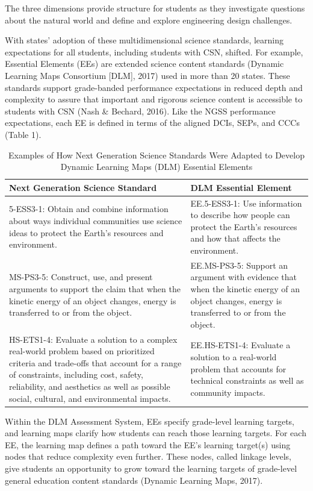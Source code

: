 \documentclass[11.5pt]{sig-alternate} %
\begin{document}
\begin{large}
The three dimensions provide structure for students as they investigate questions about the natural world and define and explore engineering design challenges.

With states’ adoption of these multidimensional science standards, learning expectations for all students, including students with CSN, shifted. For example, Essential Elements (EEs) are extended science content standards (Dynamic Learning Maps Consortium [DLM], 2017) used in more than 20 states. These standards support grade-banded performance expectations in reduced depth and complexity to assure that important and rigorous science content is accessible to students with CSN (Nash \& Bechard, 2016). Like the NGSS performance expectations, each EE is defined in terms of the aligned DCIs, SEPs, and CCCs (Table 1). 

\begin{table}[thbp]
\caption{Examples of How Next Generation Science Standards Were Adapted to Develop Dynamic Learning Maps (DLM) Essential Elements}
\begin{tabular}{|l|l|}
\hline
Next Generation Science Standard & DLM Essential Element \\ \hline
5-ESS3-1: Obtain and combine information about ways individual communities use science ideas to protect the Earth’s resources and environment. & EE.5-ESS3-1: Use information to describe how people can protect the Earth’s resources and how that affects the environment. \\ \hline
MS-PS3-5: Construct, use, and present arguments to support the claim that when the kinetic energy of an object changes, energy is transferred to or from the object. & EE.MS-PS3-5: Support an argument with evidence that when the kinetic energy of an object changes, energy is transferred to or from the object. \\ \hline
HS-ETS1-4: Evaluate a solution to a complex real-world problem based on prioritized criteria and trade-offs that account for a range of constraints, including cost, safety, reliability, and aesthetics as well as possible social, cultural, and environmental impacts. & EE.HS-ETS1-4: Evaluate a solution to a real-world problem that accounts for technical constraints as well as community impacts. \\ \hline
\end{tabular}
\end{table}

Within the DLM Assessment System, EEs specify grade-level learning targets, and learning maps clarify how students can reach those learning targets. For each EE, the learning map defines a path toward the EE’s learning target(s) using nodes that reduce complexity even further. These nodes, called linkage levels, give students an opportunity to grow toward the learning targets of grade-level general education content standards (Dynamic Learning Maps, 2017). 


\end{large}
\end{document}
